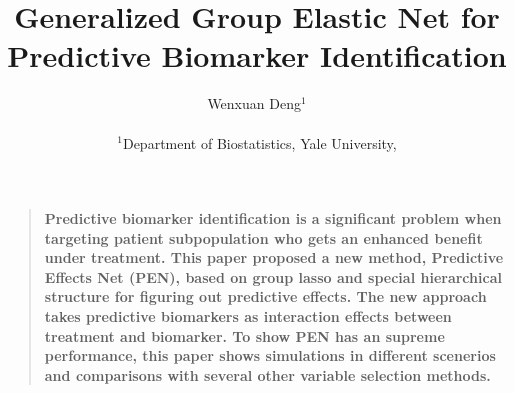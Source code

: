 \documentclass[12pt]{article}
\title{Generalized Group Elastic Net for Predictive Biomarker Identification}
\author
{Wenxuan Deng$^{1}$
\\
\\
\normalsize{$^{1}$Department of Biostatistics, Yale University,}
}
\date{}
\newenvironment{sciabstract}{%
\begin{quote} \bf}
{\end{quote}}
\begin{document}
 


\baselineskip24pt


\maketitle 




\begin{sciabstract}
  Predictive biomarker identification is a significant problem when targeting
  patient subpopulation who gets an enhanced benefit under treatment. This paper proposed
  a new method, Predictive Effects Net (PEN), based on group lasso and special hierarchical structure for figuring
  out predictive effects. The new approach takes predictive biomarkers as interaction effects between
  treatment and biomarker. To show PEN has an supreme performance, this paper shows simulations
  in different scenerios and comparisons with several other variable selection methods.
\end{sciabstract}



\end{document}
